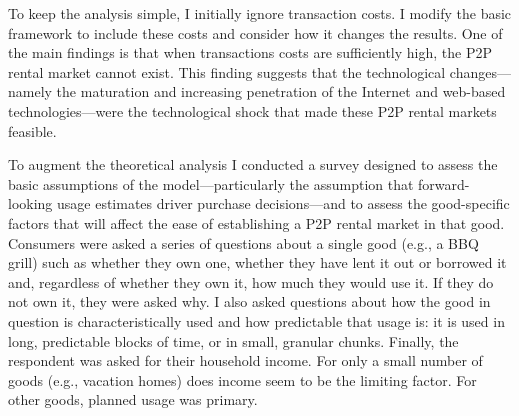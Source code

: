 \documentclass[11pt]{article}
\begin{document}
To keep the analysis simple, I initially ignore transaction costs. 
I modify the basic framework to include these costs and consider how it changes the results. 
One of the main findings is that when transactions costs are sufficiently high, the P2P rental market cannot exist. 
This finding suggests that the technological changes---namely the maturation and increasing penetration of the Internet and web-based technologies---were the technological shock that made these P2P rental markets feasible. 

To augment the theoretical analysis I conducted a survey designed to assess the basic assumptions of the model---particularly the assumption that forward-looking usage estimates driver purchase decisions---and to assess the good-specific factors that will affect the ease of establishing a P2P rental market in that good.
Consumers were asked a series of questions about a single good (e.g., a BBQ grill) such as whether they own one, whether they have lent it out or borrowed it and, regardless of whether they own it, how much they would use it. 
If they do not own it, they were asked why. 
I also asked questions about how the good in question is characteristically used and how predictable that usage is: it is used in long, predictable blocks of time, or in small, granular chunks. 
Finally, the respondent was asked for their household income.  
For only a small number of goods (e.g., vacation homes) does income seem to be the limiting factor. 
For other goods, planned usage was primary.  
\end{document}
